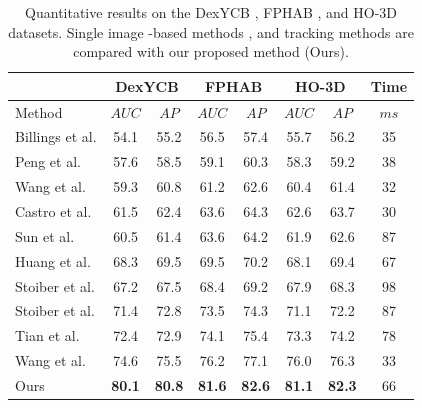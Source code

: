 \begin{table}[h]
\caption{Quantitative results on the DexYCB \cite{chao2021dexycb}, FPHAB \cite{garcia2018first}, and HO-3D \cite{hampali2020honnotate} datasets. Single image -based methods \cite{billings2019silhonet, peng2019pvnet, wang2021gdr, castro2023crt}, and tracking methods \cite{sun2021robust, huang2021pixel, he2021ffb6d, stoiber2020sparse, stoiber2022srt3d, tian2022large, wang2023deep} are compared with our proposed method (Ours).}
\label{tab:dataset_ex}
\begin{center}
\begin{tabular}{l c c c c c c c} 
\hline
& \multicolumn{2}{c}{DexYCB} & \multicolumn{2}{c}{FPHAB} & \multicolumn{2}{c}{HO-3D} & Time \\
\hline
Method & $AUC$ & $AP$ & $AUC$ & $AP$ & $AUC$ & $AP$ & $ms$ \\  
\hline 
Billings et al. \cite{billings2019silhonet} & 54.1 & 55.2 & 56.5 & 57.4 & 55.7 & 56.2 & 35 \\

Peng et al. \cite{peng2019pvnet} & 57.6 & 58.5 & 59.1 & 60.3 & 58.3 & 59.2 & 38 \\

Wang et al.\cite{wang2021gdr} & 59.3 & 60.8 & 61.2 & 62.6 & 60.4 & 61.4 & 32 \\

Castro et al. \cite{castro2023crt} & 61.5 & 62.4 & 63.6 & 64.3 & 62.6 & 63.7 & 30 \\

\hline 

Sun et al. \cite{sun2021robust} & 60.5 & 61.4 & 63.6 & 64.2 & 61.9 & 62.6 & 87 \\

Huang et al. \cite{huang2021pixel} & 68.3 & 69.5 & 69.5 & 70.2 & 68.1 & 69.4 & 67 \\

Stoiber et al. \cite{stoiber2020sparse} & 67.2 & 67.5 & 68.4 & 69.2 & 67.9 & 68.3 & 98 \\

Stoiber et al. \cite{stoiber2022srt3d} & 71.4 & 72.8 & 73.5 & 74.3 & 71.1 & 72.2 & 87 \\

Tian et al. \cite{tian2022large} & 72.4 & 72.9 & 74.1 & 75.4 & 73.3 & 74.2 & 78 \\

Wang et al. \cite{wang2023deep} & 74.6 & 75.5 & 76.2 & 77.1 & 76.0 & 76.3 & 33 \\

Ours & \textbf{80.1} & \textbf{80.8} & \textbf{81.6} & \textbf{82.6} & \textbf{81.1} & \textbf{82.3} & 66 \\
\hline
\end{tabular}
\end{center}
\end{table}

